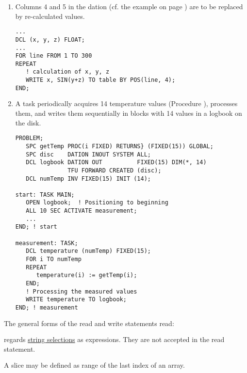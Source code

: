 \begin{enumerate}
\item Columns 4 and 5 in the dation   (cf. the example on page
\pageref{example}) are to be replaced by re-calculated values.

\begin{lstlisting}
...
DCL (x, y, z) FLOAT;
...
FOR line FROM 1 TO 300
REPEAT
   ! calculation of x, y, z
   WRITE x, SIN(y+z) TO table BY POS(line, 4);
END;
\end{lstlisting}

\item A task  periodically acquires 14 temperature values
(Procedure ), processes them, and writes them sequentially in
blocks with 14 values in a logbook on the disk.

\begin{lstlisting}
PROBLEM;
   SPC getTemp PROC(i FIXED) RETURNS} (FIXED(15)) GLOBAL;
   SPC disc    DATION INOUT SYSTEM ALL;
   DCL logbook DATION OUT          FIXED(15) DIM(*, 14)
               TFU FORWARD CREATED (disc);
   DCL numTemp INV FIXED(15) INIT (14);

start: TASK MAIN;
   OPEN logbook;  ! Positioning to beginning
   ALL 10 SEC ACTIVATE measurement;
   ... 
END; ! start

measurement: TASK;
   DCL temperature (numTemp) FIXED(15); 
   FOR i TO numTemp
   REPEAT
      temperature(i) := getTemp(i);
   END;
   ! Processing the measured values
   WRITE temperature TO logbook; 
END; ! measurement
\end{lstlisting}
\end{enumerate}

The general forms of the read and write statements read:

\begin{grammarframe}


\end{grammarframe}

\OpenPEARL{} regards \hyperlink{StringSelection}{string selections} as
expressions. They are not accepted in the read statement.

A slice may be defined as range of the last index of an array.
\begin{grammarframe}








\end{grammarframe}


